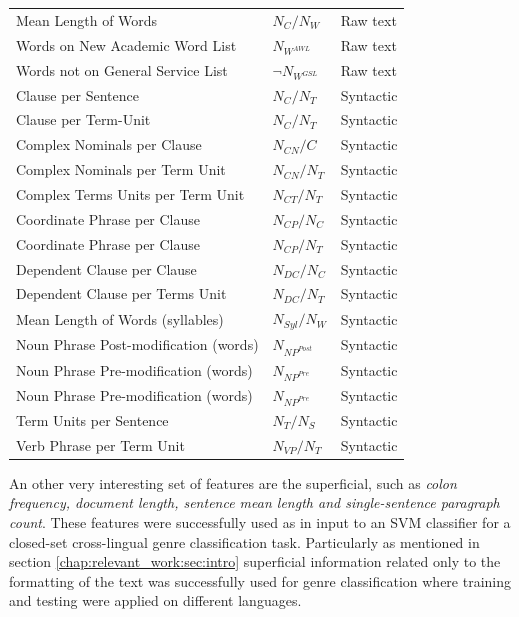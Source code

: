 \begin{table}[t]
\begin{tabular}{lll}
		Mean Length of Words & $N_{C}/N_{W}$ & Raw text \\
		Words on New Academic Word List & ${N_{W^{AWL}}}$ & Raw text \\
		Words not on General Service List & $\neg{N_{W^{GSL}}}$ & Raw text \\
		Clause per Sentence & $N_{C}/N_{T}$ & Syntactic \\
		Clause per Term-Unit & $N_{C}/N_{T}$ & Syntactic \\
		Complex Nominals per Clause & $N_{CN}/C$ & Syntactic \\
		Complex Nominals per Term Unit & $N_{CN}/N_{T}$ & Syntactic \\
		Complex Terms Units per Term Unit & $N_{CT}/N_{T}$ & Syntactic \\
		Coordinate Phrase per Clause & $N_{CP}/N_{C}$ & Syntactic \\
		Coordinate Phrase per Clause & $N_{CP}/N_{T}$ & Syntactic \\
		Dependent Clause per Clause & $N_{DC}/N_{C}$ & Syntactic \\
		Dependent Clause per Terms Unit & $N_{DC}/N_{T}$ & Syntactic \\
		Mean Length of Words (syllables) & $N_{Syl}/N_{W}$ & Syntactic \\
		Noun Phrase Post-modification (words) & $N_{NP^{Post}}$ & Syntactic \\
		Noun Phrase Pre-modification (words) & $N_{NP^{Pre}}$ & Syntactic \\
		Noun Phrase Pre-modification (words) & $N_{NP^{Pre}}$ & Syntactic \\
		Term Units per Sentence & $N_{T}/N_{S}$ & Syntactic \\
		Verb Phrase per Term Unit &  $N_{VP}/N_{T}$ & Syntactic \\
		\hline
	\end{tabular}
\end{table}

 An other very interesting set of features are the superficial, such as \textit{colon frequency, document length, sentence mean length and single-sentence paragraph count}. These features were successfully used as in input to an SVM classifier for a closed-set cross-lingual genre classification task. Particularly as mentioned in section \ref{chap:relevant_work:sec:intro} superficial information related only to the formatting of the text was successfully used for genre classification where training and testing were applied on different languages\parencite{nguyen2019cross}.
 
